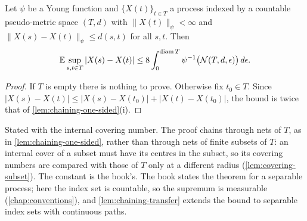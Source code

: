\begin{theorem}
  \label{thm:han-4-4}
  Let $\psi$ be a Young function and $\{X(t)\}_{t\in T}$ a process indexed by a countable pseudo-metric space $(T,d)$ with $\|X(t)\|_\psi<\infty$ and $\|X(s)-X(t)\|_\psi\le d(s,t)$ for all $s,t$. Then
  \[
    \mathbb{E}\sup_{s,t\in T}|X(s)-X(t)|\le8\int_0^{\operatorname{diam} T}\psi^{-1}\bigl(\mathcal{N}(T,d,\epsilon)\bigr)\,d\epsilon.
  \]
\end{theorem}
\begin{proof}
  If $T$ is empty there is nothing to prove. Otherwise fix $t_0\in T$. Since $|X(s)-X(t)|\le|X(s)-X(t_0)|+|X(t)-X(t_0)|$, the bound is twice that of \cref{lem:chaining-one-sided}(i).
\end{proof}
\begin{remark}
  Stated with the internal covering number. The proof chains through nets of $T$, as in \cref{lem:chaining-one-sided}, rather than through nets of finite subsets of $T$: an internal cover of a subset must have its centres in the subset, so its covering numbers are compared with those of $T$ only at a different radius (\cref{lem:covering-subset}). The constant is the book's. The book states the theorem for a separable process; here the index set is countable, so the supremum is measurable (\cref{chap:conventions}), and \cref{lem:chaining-transfer} extends the bound to separable index sets with continuous paths.
\end{remark}

